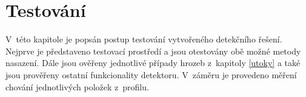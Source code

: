 \documentclass[thesis=M,czech]{FITthesis}[2012/06/26]
\begin{document}
\chapter{Testování}
V~této kapitole je popsán postup testování vytvořeného detekčního řešení. Nejprve je představeno
testovací prostředí a jsou otestovány obě možné metody nasazení. Dále jsou ověřeny jednotlivé 
případy hrozeb z~kapitoly \ref{utoky} a také jsou prověřeny ostatní funkcionality
detektoru. V~záměru je provedeno měření chování jednotlivých položek z~profilu.

 

\begin{conclusion}
\end{conclusion}




\appendix
\end{document}

